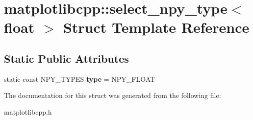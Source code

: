 \hypertarget{structmatplotlibcpp_1_1select__npy__type_3_01float_01_4}{}\section{matplotlibcpp\+:\+:select\+\_\+npy\+\_\+type$<$ float $>$ Struct Template Reference}
\label{structmatplotlibcpp_1_1select__npy__type_3_01float_01_4}
\subsection*{Static Public Attributes}
\begin{DoxyCompactItemize}
\item 
\mbox{\label{structmatplotlibcpp_1_1select__npy__type_3_01float_01_4_a7bca025a3f0cb143e566e0f575bf7f6b}} 
static const N\+P\+Y\+\_\+\+T\+Y\+P\+ES {\bfseries type} = N\+P\+Y\+\_\+\+F\+L\+O\+AT
\end{DoxyCompactItemize}


The documentation for this struct was generated from the following file\+:\begin{DoxyCompactItemize}
\item 
matplotlibcpp.\+h\end{DoxyCompactItemize}
